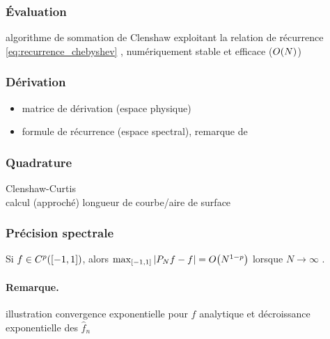 \subsubsection{Évaluation}
algorithme de sommation de Clenshaw exploitant la relation de récurrence \eqref{eq:recurrence_chebyshev} \cite{clenshaw1955}, numériquement stable et efficace ($\bigO{N}$)

\subsubsection{Dérivation}
\begin{itemize}
	\item matrice de dérivation (espace physique)
	\item formule de récurrence (espace spectral), remarque de \cite[Section 2.3, p~.94]{wengle1978}%
\end{itemize}

\subsubsection{Quadrature}
Clenshaw-Curtis\\
calcul (approché) longueur de courbe/aire de surface

\subsubsection{Précision spectrale}
Si $f \in C^p(\chebinterval)$, alors $\max_{\chebinterval} \left| \truncseries{f}{N} - f \right| = \bigO{N^{1-p}}$ lorsque $N \to \infty$ \cite[Théorème 5.14]{mason2002}.\\
\paragraph{Remarque.}
illustration convergence exponentielle pour $f$ analytique et décroissance exponentielle des $\hat{f}_n$



